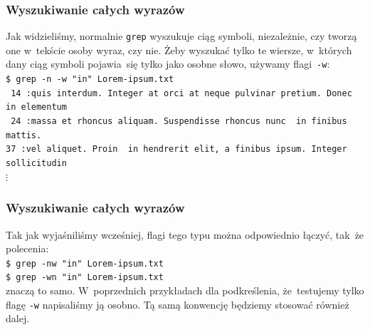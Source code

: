 \documentclass[10pt,t]{beamer}
\begin{document}
\begin{frame}
  \frametitle{Wyszukiwanie całych wyrazów}


  Jak widzieliśmy, normalnie \texttt{grep} wyszukuje ciąg symboli,
  niezależnie, czy tworzą one w~tekście osoby wyraz, czy nie. Żeby
  wyszukać tylko te wiersze, w~których dany ciąg symboli pojawia~się
  tylko jako osobne słowo, używamy flagi~\texttt{-w}: \\
  \texttt{\$ grep -n -w "in"{} Lorem-ipsum.txt} \\
  \texttt{{\color{green} 14}{\color{jAxisBlue} :}quis interdum. Integer at
    orci at neque pulvinar pretium. Donec {\color{red} in} elementum} \\
  \texttt{{\color{green} 24}{\color{jAxisBlue} :}massa et rhoncus aliquam.
    Suspendisse rhoncus nunc {\color{red} in} finibus mattis.} \\
  \texttt{{\color{green}37}{\color{jAxisBlue} :}vel aliquet. Proin
    {\color{red} in} hendrerit elit, a finibus ipsum. Integer
    sollicitudin} \\
  \hspace{1em} $\vdots$ \\

\end{frame}





\begin{frame}
  \frametitle{Wyszukiwanie całych wyrazów}


  Tak jak wyjaśniliśmy wcześniej, flagi tego typu można odpowiednio łączyć,
  tak~że polecenia: \\
  \texttt{\$ grep -nw "in"{} Lorem-ipsum.txt} \\
  \texttt{\$ grep -wn "in"{} Lorem-ipsum.txt} \\
  znaczą to samo. W~poprzednich przykładach dla podkreślenia, że~testujemy
  tylko flagę \texttt{-w} napisaliśmy ją osobno. Tą samą konwencję
  będziemy stosować również dalej.

\end{frame}
\end{document}
